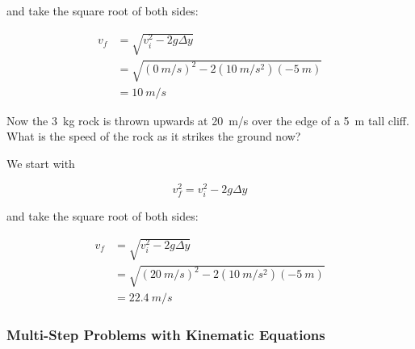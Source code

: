 \documentclass[]{exam}
\theoremstyle{definition}
\begin{document}
\begin{questions}
\begin{solution}
and take the square root of both sides:

\begin{align*}
    v_f &= \sqrt{v_i^2 - 2g \Delta y} \\[1ex]
    &= \sqrt{(\SI{0}{m/s})^2 - 2(\SI{10}{m/s^2})(-\SI{5}{m})} \\[1ex]
    &= \boxed{\SI{10}{m/s}}
\end{align*}
\end{solution}

\question
Now the \SI{3}{kg} rock is thrown upwards at \SI{20}{m/s} over the edge of a \SI{5}{m} tall cliff. What is the speed of the rock as it strikes the ground now?

\begin{solution}
We start with 

\begin{equation*}
    v_f^2 = v_i^2 - 2g \Delta y
\end{equation*}

and take the square root of both sides:

\begin{align*}
    v_f &= \sqrt{v_i^2 - 2g \Delta y} \\[1ex]
    &= \sqrt{(\SI{20}{m/s})^2 - 2(\SI{10}{m/s^2})(-\SI{5}{m})} \\[1ex]
    &= \boxed{\SI{22.4}{m/s}}
\end{align*}
\end{solution}


\end{questions}

\clearpage

\subsubsection*{Multi-Step Problems with Kinematic Equations}
\end{document}
